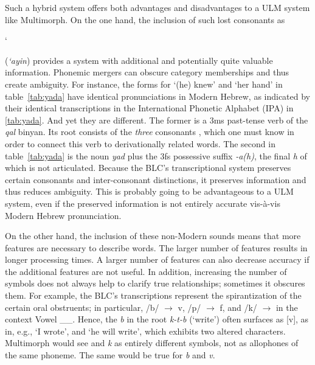 Such a hybrid system offers both advantages and disadvantages to a 
ULM system like Multimorph. 
On the one hand, the inclusion of such lost consonants as 
\begin{cjhebrew}`\end{cjhebrew} 
(\textit{`ayin}) provides a system with additional and potentially 
quite valuable information. 
Phonemic mergers can obscure category memberships and thus 
create ambiguity. For instance, 
the forms for `(he) knew' and `her hand' in  table~\ref{tab:yada}
have identical pronunciations in Modern Hebrew, as indicated 
by their identical transcriptions in the International Phonetic Alphabet (IPA)
in \ref{tab:yada}. And yet they are different. 
The former is a 3ms past-tense verb of the 
\emph{qal} binyan. Its root consists of the \emph{three}
consonants \textit{}, which one must 
know in order 
to connect this verb to derivationally related words. 
The second \textipa{[yad\`{a}]} 
in table~\ref{tab:yada} is the noun \textit{yad} plus 
the 3fs possessive suffix 
\textit{-a(h)}, the final \emph{h} of which is not articulated. 
Because the BLC's transcriptional system preserves 
certain consonants and 
inter-consonant distinctions, it preserves information and 
thus reduces ambiguity. 
This is probably going to be advantageous to a ULM 
system, even if the preserved 
information is not entirely accurate vis-\`{a}-vis Modern Hebrew 
pronunciation.

On the other hand, the inclusion of these non-Modern 
sounds means that more features are necessary to describe 
words. The larger number of features results in longer processing times. 
A larger number of features can also decrease accuracy 
if the additional features are not useful. 
In addition, increasing the number of symbols does not 
always help to clarify true relationships; sometimes it 
obscures them. For example, the BLC's transcriptions 
represent the spirantization of the certain oral obstruents; 
in particular, /b/ $\to$ v, /p/ $\to$ f, and /k/ $\to$  
in the context
Vowel \_\_. Hence, the \textit{b} in the root \textit{k-t-b} 
(`write') often surfaces as [v], as in, e.g.,  
`I wrote', and 
 `he will write', which exhibits 
two altered characters. Multimorph would see \textit{} 
and \textit{k} as 
entirely different symbols, not as allophones
of the same phoneme. The same would be true for \textit{b} 
and \textit{v}.  


